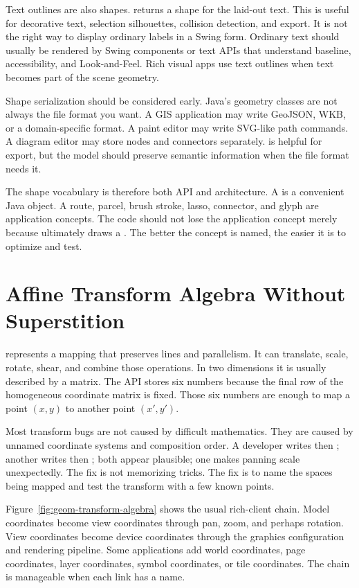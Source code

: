 Text outlines are also shapes.  returns a shape for the laid-out text. This is useful for decorative text, selection silhouettes, collision detection, and export. It is not the right way to display ordinary labels in a Swing form. Ordinary text should usually be rendered by Swing components or text APIs that understand baseline, accessibility, and Look-and-Feel. Rich visual apps use text outlines when text becomes part of the scene geometry.

Shape serialization should be considered early. Java's geometry classes are not always the file format you want. A GIS application may write GeoJSON, WKB, or a domain-specific format. A paint editor may write SVG-like path commands. A diagram editor may store nodes and connectors separately.  is helpful for export, but the model should preserve semantic information when the file format needs it.

The shape vocabulary is therefore both API and architecture. A  is a convenient Java object. A route, parcel, brush stroke, lasso, connector, and glyph are application concepts. The code should not lose the application concept merely because  ultimately draws a . The better the concept is named, the easier it is to optimize and test.

\section{Affine Transform Algebra Without Superstition}

 represents a mapping that preserves lines and parallelism. It can translate, scale, rotate, shear, and combine those operations. In two dimensions it is usually described by a matrix. The API stores six numbers because the final row of the homogeneous coordinate matrix is fixed. Those six numbers are enough to map a point \((x,y)\) to another point \((x',y')\).

Most transform bugs are not caused by difficult mathematics. They are caused by unnamed coordinate systems and composition order. A developer writes  then ; another writes  then ; both appear plausible; one makes panning scale unexpectedly. The fix is not memorizing tricks. The fix is to name the spaces being mapped and test the transform with a few known points.

Figure~\ref{fig:geom-transform-algebra} shows the usual rich-client chain. Model coordinates become view coordinates through pan, zoom, and perhaps rotation. View coordinates become device coordinates through the graphics configuration and rendering pipeline. Some applications add world coordinates, page coordinates, layer coordinates, symbol coordinates, or tile coordinates. The chain is manageable when each link has a name.

